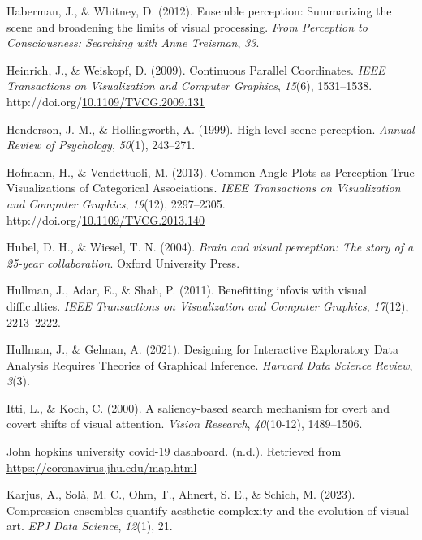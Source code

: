 \documentclass[print]{nuthesis}
\newlength{\cslhangindent}
\newenvironment{CSLReferences}[2]%
{\setlength{\parindent}{0pt}%
\everypar{\setlength{\hangindent}{\cslhangindent}}\ignorespaces}%
{\par}
\begin{document}
\begin{CSLReferences}{1}{0}
\leavevmode{}%
Haberman, J., \& Whitney, D. (2012). Ensemble perception: Summarizing the scene and broadening the limits of visual processing. \emph{From Perception to Consciousness: Searching with Anne Treisman}, \emph{33}.

\leavevmode{}%
Heinrich, J., \& Weiskopf, D. (2009). {Continuous Parallel Coordinates}. \emph{IEEE Transactions on Visualization and Computer Graphics}, \emph{15}(6), 1531--1538. http://doi.org/\href{https://doi.org/10.1109/TVCG.2009.131}{10.1109/TVCG.2009.131}

\leavevmode{}%
Henderson, J. M., \& Hollingworth, A. (1999). High-level scene perception. \emph{Annual Review of Psychology}, \emph{50}(1), 243--271.

\leavevmode{}%
Hofmann, H., \& Vendettuoli, M. (2013). {Common Angle Plots as Perception-True Visualizations of Categorical Associations}. \emph{IEEE Transactions on Visualization and Computer Graphics}, \emph{19}(12), 2297--2305. http://doi.org/\href{https://doi.org/10.1109/TVCG.2013.140}{10.1109/TVCG.2013.140}

\leavevmode{}%
Hubel, D. H., \& Wiesel, T. N. (2004). \emph{Brain and visual perception: The story of a 25-year collaboration}. Oxford University Press.

\leavevmode{}%
Hullman, J., Adar, E., \& Shah, P. (2011). Benefitting infovis with visual difficulties. \emph{IEEE Transactions on Visualization and Computer Graphics}, \emph{17}(12), 2213--2222.

\leavevmode{}%
Hullman, J., \& Gelman, A. (2021). Designing for {Interactive} {Exploratory} {Data} {Analysis} {Requires} {Theories} of {Graphical} {Inference}. \emph{Harvard Data Science Review}, \emph{3}(3).

\leavevmode{}%
Itti, L., \& Koch, C. (2000). A saliency-based search mechanism for overt and covert shifts of visual attention. \emph{Vision Research}, \emph{40}(10-12), 1489--1506.

\leavevmode{}%
John hopkins university covid-19 dashboard. (n.d.). Retrieved from \url{https://coronavirus.jhu.edu/map.html}

\leavevmode{}%
Karjus, A., Solà, M. C., Ohm, T., Ahnert, S. E., \& Schich, M. (2023). Compression ensembles quantify aesthetic complexity and the evolution of visual art. \emph{EPJ Data Science}, \emph{12}(1), 21.


\end{CSLReferences}
\end{document}
